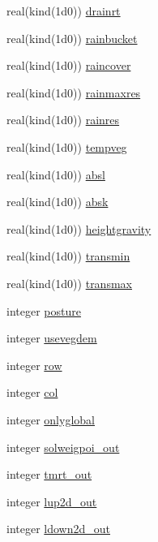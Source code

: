 \begin{DoxyCompactItemize}
\item 
real(kind(1d0)) \hyperlink{namespacedata__in_abc838b310998f8cef4246fd9d724e903}{drainrt}
\item 
real(kind(1d0)) \hyperlink{namespacedata__in_a959499405172092dfb8d49b61bfec809}{rainbucket}
\item 
real(kind(1d0)) \hyperlink{namespacedata__in_a8a79043a75a7cba200c72ec10044bcd3}{raincover}
\item 
real(kind(1d0)) \hyperlink{namespacedata__in_a2ea729731f7651be567d3392e184bf47}{rainmaxres}
\item 
real(kind(1d0)) \hyperlink{namespacedata__in_aaacec9be1e147ab0d69fee857ecd57cd}{rainres}
\item 
real(kind(1d0)) \hyperlink{namespacedata__in_afff1f4919ba95d947fa5e34493cc9fa3}{tempveg}
\item 
real(kind(1d0)) \hyperlink{namespacedata__in_a110ac150ce724bc8739056a64c759aa0}{absl}
\item 
real(kind(1d0)) \hyperlink{namespacedata__in_a3d4be49c81c1b70a22e0eee6d542cd59}{absk}
\item 
real(kind(1d0)) \hyperlink{namespacedata__in_a1d9097970f09654fb90ab93ffea8d0a6}{heightgravity}
\item 
real(kind(1d0)) \hyperlink{namespacedata__in_a41ecad1a8c8dc7524f1197ded67dd815}{transmin}
\item 
real(kind(1d0)) \hyperlink{namespacedata__in_a22d45e9410b8efdc18d68d246d3162ce}{transmax}
\item 
integer \hyperlink{namespacedata__in_acf23439514c76b06ead9eb622e0dde05}{posture}
\item 
integer \hyperlink{namespacedata__in_a0d727fe2b398f97607c4ef74b9277286}{usevegdem}
\item 
integer \hyperlink{namespacedata__in_adf1b4fbb82731352f1a733cb1824c4b6}{row}
\item 
integer \hyperlink{namespacedata__in_a14362e5d9e2032601b72e6b50e7a338c}{col}
\item 
integer \hyperlink{namespacedata__in_aa01c62f4d3c77eccd73d51c81438ac1a}{onlyglobal}
\item 
integer \hyperlink{namespacedata__in_add17d78f3c3ee4dde8d1a3d9630068ca}{solweigpoi\+\_\+out}
\item 
integer \hyperlink{namespacedata__in_ab2df8c3fb9195933d38aeda912642950}{tmrt\+\_\+out}
\item 
integer \hyperlink{namespacedata__in_a7a7382928accd01035de817c6e632b86}{lup2d\+\_\+out}
\item 
integer \hyperlink{namespacedata__in_a22e1d481d73a8409fc8c9df3ac03f209}{ldown2d\+\_\+out}

\end{DoxyCompactItemize}
